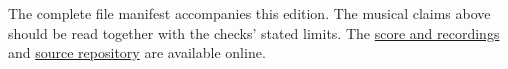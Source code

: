 \documentclass[11pt,a4paper]{article}
\begin{document}
The complete file manifest accompanies this edition. The musical claims above should be read together with the checks' stated limits. The \href{https://chi-feng.github.io/fuga-inversa/}{score and recordings} and \href{https://github.com/chi-feng/fuga-inversa}{source repository} are available online.
\end{document}

